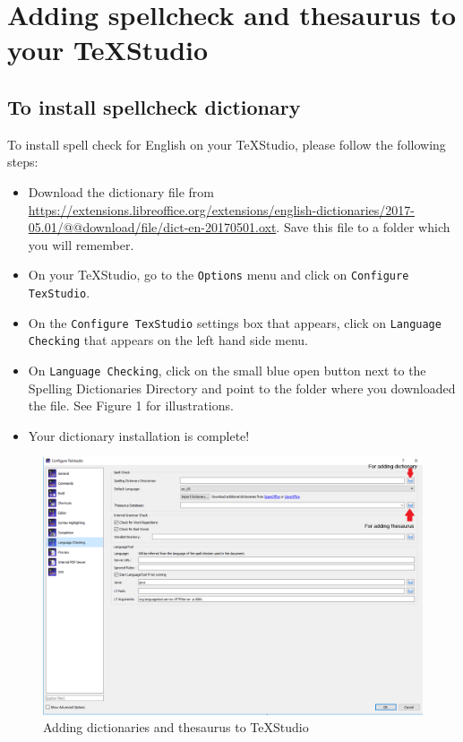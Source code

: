 \documentclass[]{article}
\begin{document}
\section*{Adding spellcheck and thesaurus to your TeXStudio}

\subsection*{To install spellcheck dictionary}
To install spell check for English on your TeXStudio, please follow the following steps:

\begin{itemize}
	\item Download the dictionary file from \url{https://extensions.libreoffice.org/extensions/english-dictionaries/2017-05.01/@@download/file/dict-en-20170501.oxt}. Save this file to a folder which you will remember.
	\item On your TeXStudio, go to the \texttt{Options} menu and click on \texttt{Configure TexStudio}.
	\item On the \texttt{Configure TexStudio} settings box that appears, click on \texttt{Language Checking} that appears on the left hand side menu.
	\item On \texttt{Language Checking}, click on the small blue open button next to the Spelling Dictionaries Directory and point to the folder where you downloaded the file. See Figure 1 for illustrations.
	\item Your dictionary installation is complete!
\end{itemize}

\begin{figure}[H]
	\centering
	\includegraphics[scale = 0.5]{img/languagetool}
	\caption{Adding dictionaries and thesaurus to TeXStudio}
\end{figure}
\end{document}
